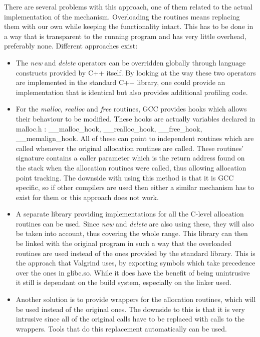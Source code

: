 There are several problems with this approach, one of them related to the actual implementation of the mechanism. Overloading the routines means replacing them with our own while keeping the functionality intact. This has to be done in a way that is transparent to the running program and has very little overhead, preferably none. Different approaches exist:
\begin{itemize}
\item The \textit{new} and \textit{delete} operators can be overridden globally through language constructs provided by C++ itself. By looking at the way these two operators are implemented in the standard C++ library, one could provide an implementation that is identical but also provides additional profiling code.
\item For the \textit{malloc}, \textit{realloc} and \textit{free} routines, GCC provides hooks which allows their behaviour to be modified. These hooks are actually variables declared in malloc.h : \_\_malloc\_hook, \_\_realloc\_hook, \_\_free\_hook, \_\_memalign\_hook. All of these can point to independent routines which are called whenever the original allocation routines are called. These routines' signature contains a caller parameter which is the return address found on the stack when the allocation routines were called, thus allowing allocation point tracking\cite{GCCman}. The downside with using this method is that it is GCC specific, so if other compilers are used then either a similar mechanism has to exist for them or this approach does not work.
\item A separate library providing implementations for all the C-level allocation routines can be used. Since \textit{new} and \textit{delete} are also using these, they will also be taken into account, thus covering the whole range. This library can then be linked with the original program in such a way that the overloaded routines are used instead of the ones provided by the standard library. This is the approach that Valgrind uses, by exporting symbols which take precedence over the ones in glibc.so\cite{Seward02}. While it does have the benefit of being unintrusive it still is dependant on the build system, especially on the linker used.
\item Another solution is to provide wrappers for the allocation routines, which will be used instead of the original ones. The downside to this is that it is very intrusive since all of the original calls have to be replaced with calls to the wrappers. Tools that do this replacement automatically can be used.
\end{itemize}

